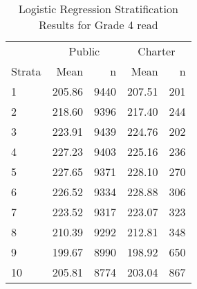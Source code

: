 \begin{table}[ht]
\centering
\caption{Logistic Regression Stratification Results for Grade 4 read} 
\label{g4read-circpsa10}
\begin{tabular}{lrr@{\extracolsep{.2cm}}rr}
  \hline
   & \multicolumn{2}{c}{Public} & \multicolumn{2}{c}{Charter} \\ \cline{2-3} \cline{4-5} Strata & Mean & n & Mean & n \\ \hline
1 & 205.86 & 9440 & 207.51 & 201 \\ 
  2 & 218.60 & 9396 & 217.40 & 244 \\ 
  3 & 223.91 & 9439 & 224.76 & 202 \\ 
  4 & 227.23 & 9403 & 225.16 & 236 \\ 
  5 & 227.65 & 9371 & 228.10 & 270 \\ 
  6 & 226.52 & 9334 & 228.88 & 306 \\ 
  7 & 223.52 & 9317 & 223.07 & 323 \\ 
  8 & 210.39 & 9292 & 212.81 & 348 \\ 
  9 & 199.67 & 8990 & 198.92 & 650 \\ 
  10 & 205.81 & 8774 & 203.04 & 867 \\ 
   \hline
\end{tabular}
\end{table}
